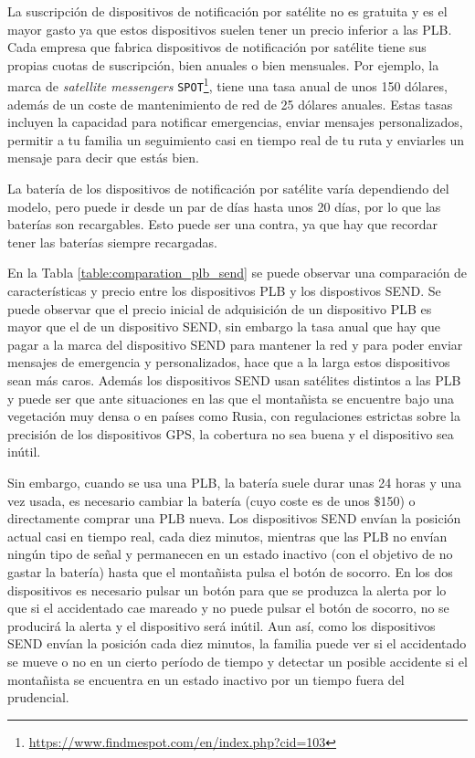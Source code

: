 La suscripción de dispositivos de notificación por satélite no es gratuita y es el mayor gasto ya que estos dispositivos suelen tener un precio inferior a las \ac{PLB}. Cada empresa que fabrica dispositivos de notificación por satélite tiene sus propias cuotas de suscripción, bien anuales o bien mensuales. Por ejemplo, la marca de \textit{satellite messengers} \texttt{SPOT}\footnote{\url{https://www.findmespot.com/en/index.php?cid=103}}, tiene una tasa anual de unos 150 dólares, además de un coste de mantenimiento de red de 25 dólares anuales. Estas tasas incluyen la capacidad para notificar emergencias, enviar mensajes personalizados, permitir a tu familia un seguimiento casi en tiempo real de tu ruta y enviarles un mensaje para decir que estás bien.

La batería de los dispositivos de notificación por satélite varía dependiendo del modelo, pero puede ir desde un par de días hasta unos 20 días, por lo que las baterías son recargables. Esto puede ser una contra, ya que hay que recordar tener las baterías siempre recargadas. 

En la Tabla \ref{table:comparation_plb_send} se puede observar una comparación de características y precio entre los dispositivos \ac{PLB} y los dispostivos \ac{SEND}. Se puede observar que el precio inicial de adquisición de un dispositivo \ac{PLB} es mayor que el de un dispositivo \ac{SEND}, sin embargo la tasa anual que hay que pagar a la marca del dispositivo \ac{SEND} para mantener la red y para poder enviar mensajes de emergencia y personalizados, hace que a la larga estos dispositivos sean más caros. Además los dispositivos \ac{SEND} usan satélites distintos a las \ac{PLB} y puede ser que ante situaciones en las que el montañista se encuentre bajo una vegetación muy densa o en países como Rusia, con regulaciones estrictas sobre la precisión de los dispositivos \ac{GPS}, la cobertura no sea buena y el dispositivo sea inútil. 

Sin embargo, cuando se usa una \ac{PLB}, la batería suele durar unas 24 horas y una vez usada, es necesario cambiar la batería (cuyo coste es de unos \$150) o directamente comprar una \ac{PLB} nueva. Los dispositivos \ac{SEND} envían la posición actual casi en tiempo real, cada diez minutos, mientras que las \ac{PLB} no envían ningún tipo de señal y permanecen en un estado inactivo (con el objetivo de no gastar la batería) hasta que el montañista pulsa el botón de socorro. En los dos dispositivos es necesario pulsar un botón para que se produzca la alerta por lo que si el accidentado cae mareado y no puede pulsar el botón de socorro, no se producirá la alerta y el dispositivo será inútil. Aun así, como los dispositivos \ac{SEND} envían la posición cada diez minutos, la familia puede ver si el accidentado se mueve o no en un cierto período de tiempo y detectar un posible accidente si el montañista se encuentra en un estado inactivo por un tiempo fuera del prudencial.

